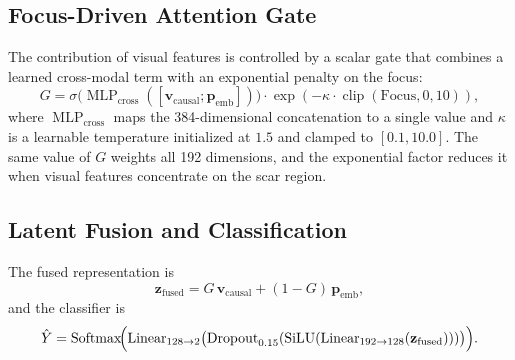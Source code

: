 \subsection{Focus-Driven Attention Gate}
The contribution of visual features is controlled by a scalar gate that combines a learned cross-modal term with an exponential penalty on the focus:
\begin{equation}
G = \sigma\!\bigl(\operatorname{MLP}_{\text{cross}}([\mathbf{v}_{\text{causal}}; \mathbf{p}_{\text{emb}}])\bigr) \cdot \exp(-\kappa \cdot \operatorname{clip}(\text{Focus}, 0, 10)),
\end{equation}
where $\operatorname{MLP}_{\text{cross}}$ maps the 384-dimensional concatenation to a single value and $\kappa$ is a learnable temperature initialized at $1.5$ and clamped to $[0.1, 10.0]$. The same value of $G$ weights all 192 dimensions, and the exponential factor reduces it when visual features concentrate on the scar region.

\subsection{Latent Fusion and Classification}
The fused representation is
\begin{equation}
\mathbf{z}_{\text{fused}} = G\, \mathbf{v}_{\text{causal}} + (1 - G)\, \mathbf{p}_{\text{emb}},
\end{equation}
and the classifier is
\begin{equation}
\hat{Y} = \operatorname{Softmax}\!\Bigl(\operatorname{Linear}_{128 \to 2}\bigl(\operatorname{Dropout}_{0.15}(\operatorname{SiLU}(\operatorname{Linear}_{192 \to 128}(\mathbf{z}_{\text{fused}})))\bigr)\Bigr).
\end{equation}

